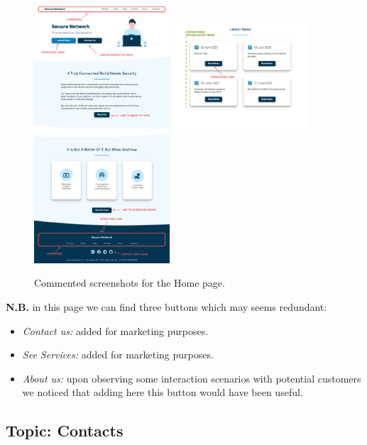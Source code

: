 \documentclass[12pt]{report}
\begin{document}
\begin{figure}[H]
	\centering
	\includegraphics[width=0.45\textwidth]{high_fid_wireframes/home/1.png}
	\includegraphics[width=0.45\textwidth]{high_fid_wireframes/home/2.png}
	\includegraphics[width=0.45\textwidth]{high_fid_wireframes/home/3.png}
	\caption{Commented screenshots for the Home page.}
\end{figure}
\textbf{N.B.} in this page we can find three buttons which may seems redundant:
\begin{itemize}
	\item \emph{Contact us:} added for marketing purposes.
	\item \emph{See Services:} added for marketing purposes.
	\item \emph{About us:} upon observing some interaction scenarios with 
	potential customers we noticed that adding here this button would have been useful.
\end{itemize}
\subsection{Topic: Contacts}
\end{document}
